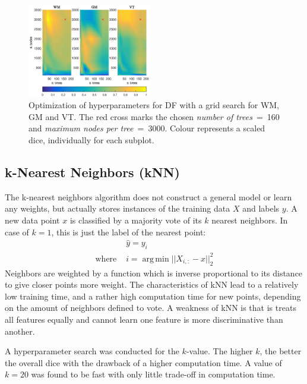 \documentclass[journal]{IEEEtran}
\DeclareMathOperator*{\argmin}{arg\,min}
\begin{document}
\begin{figure}[h!]
	\centering
	\includegraphics[width=0.48\textwidth]{images/df_grid}
	\caption{Optimization of hyperparameters for DF with a grid search for WM, GM and VT. The red cross marks the chosen \textit{number of trees}~=~160 and \textit{maximum nodes per tree}~=~3000. Colour represents a scaled dice, individually for each subplot.}\label{f.df_gridsearch}
\end{figure}

\subsection{k-Nearest Neighbors (kNN)}
The k-nearest neighbors algorithm does not construct a general model or learn any weights, but actually stores instances of the training data $X$ and labels $y$. A new data point $x$ is classified by a majority vote of its $k$ nearest neighbors. In case of $k=1$, this is just the label of the nearest point:
\begin{equation}
\begin{split}
& \hat{y} = y_i \\
\text{where } & i = \argmin ||X_{i,:} - x||_2^2
\end{split}
\end{equation}
Neighbors are weighted by a function which is inverse proportional to its distance to give closer points more weight. The characteristics of kNN lead to a relatively low training time, and a rather high computation time for new points, depending on the amount of neighbors defined to vote. A weakness of kNN is that is treats all features equally and cannot learn one feature is more discriminative than another.

A hyperparameter search was conducted for the $k$-value. The higher $k$, the better the overall dice with the drawback of a higher computation time. A value of $k=20$ was found to be fast with only little trade-off in computation time.
\end{document}
